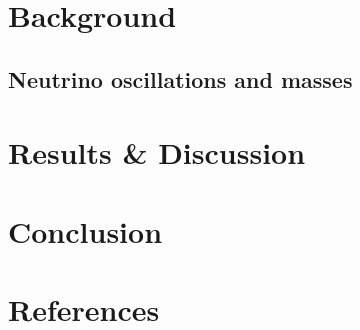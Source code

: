 \documentclass[a4paper,12pt]{article}
\begin{document}
\section{Background}
\subsection{Neutrino oscillations and masses}

\section{Results \& Discussion}

\section{Conclusion}

\section{References}
\end{document}
